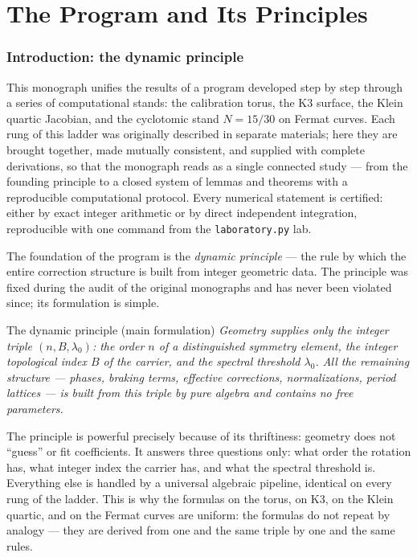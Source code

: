 \part{The Program and Its Principles}

\section{Introduction: the dynamic principle}\label{sec:intro}

This monograph unifies the results of a program developed step by
step through a series of computational stands: the calibration torus,
the K3 surface, the Klein quartic Jacobian, and the cyclotomic stand
$N=15/30$ on Fermat curves. Each rung of this ladder was originally
described in separate materials; here they are brought together,
made mutually consistent, and supplied with complete derivations, so
that the monograph reads as a single connected study --- from the
 founding principle to a closed system of lemmas and theorems with a
reproducible computational protocol. Every numerical statement is
certified: either by exact integer arithmetic or by direct
independent integration, reproducible with one command from the
\texttt{laboratory.py} lab.

The foundation of the program is the \emph{dynamic principle} ---
the rule by which the entire correction structure is built from
integer geometric data. The principle was fixed during the audit of
the original monographs and has never been violated since; its
formulation is simple.

\begin{keybox}{The dynamic principle (main formulation)}
\emph{Geometry supplies only the integer triple $(n,B,\lambda_0)$:
the order $n$ of a distinguished symmetry element, the integer
topological index $B$ of the carrier, and the spectral threshold
$\lambda_0$. All the remaining structure --- phases, braking terms,
effective corrections, normalizations, period lattices --- is built
from this triple by pure algebra and contains no free parameters.}
\end{keybox}

The principle is powerful precisely because of its thriftiness:
geometry does not ``guess'' or fit coefficients. It answers three
questions only: what order the rotation has, what integer index the
carrier has, and what the spectral threshold is. Everything else is
handled by a universal algebraic pipeline, identical on every rung
of the ladder. This is why the formulas on the torus, on K3, on the
Klein quartic, and on the Fermat curves are uniform: the formulas do
not repeat by analogy --- they are derived from one and the same
triple by one and the same rules.

